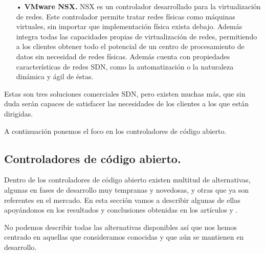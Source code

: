 \documentclass[a4paper,11pt]{book}
\begin{document}
\begin{itemize}
\item[•]\textbf{VMware NSX.} NSX es un controlador desarrollado para la virtualización de redes. Este controlador permite tratar redes físicas como máquinas virtuales, sin importar que implementación física exista debajo. Además integra todas las capacidades propias de virtualización de redes, permitiendo a los clientes obtener todo el potencial de un centro de procesamiento de datos sin necesidad de redes físicas. Además cuenta con propiedades características de redes \ac{SDN}, como la automatización o la naturaleza dinámica y ágil de éstas.
\end{itemize}

Estas son tres soluciones comerciales \ac{SDN}, pero existen muchas más, que sin duda serán capaces de satisfacer las necesidades de los clientes a los que están dirigidas. 

A continuación ponemos el foco en los controladores de código abierto.

\subsection{Controladores de código abierto.} Dentro de los controladores de código abierto existen multitud de alternativas, algunas en fases de desarrollo muy tempranas y novedosas, y otras que ya son referentes en el mercado. En esta sección vamos a describir algunas de ellas apoyándonos en los resultados y conclusiones obtenidas en los artículos \cite{comparativaSDN1} y \cite{comparativaSDN2}. 

No podemos describir todas las alternativas disponibles así que nos hemos centrado en aquellas que consideramos conocidas y que aún se mantienen en desarrollo.
\end{document}
